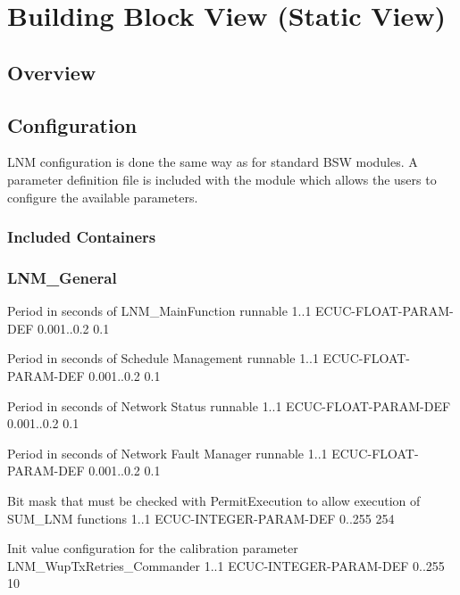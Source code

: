 \chapter{Building Block View (Static View)}

\section{Overview}

\section{Configuration}

LNM configuration is done the same way as for standard BSW modules. A parameter definition file is included with the module which allows 
the users to configure the available parameters.

\subsection{Included Containers}



\subsection{LNM_General}
\label{sec:LNM_General}

{Period in seconds of LNM_MainFunction runnable}
{1..1}
{ECUC-FLOAT-PARAM-DEF}
{0.001..0.2}
{0.1}


{Period in seconds of Schedule Management runnable}
{1..1}
{ECUC-FLOAT-PARAM-DEF}
{0.001..0.2}
{0.1}


{Period in seconds of Network Status runnable}
{1..1}
{ECUC-FLOAT-PARAM-DEF}
{0.001..0.2}
{0.1}


{Period in seconds of Network Fault Manager runnable}
{1..1}
{ECUC-FLOAT-PARAM-DEF}
{0.001..0.2}
{0.1}


{Bit mask that must be checked with PermitExecution to allow execution of SUM_LNM functions}
{1..1}
{ECUC-INTEGER-PARAM-DEF}
{0..255}
{254}


{Init value configuration for the calibration parameter LNM_WupTxRetries_Commander}
{1..1}
{ECUC-INTEGER-PARAM-DEF}
{0..255}
{10}


